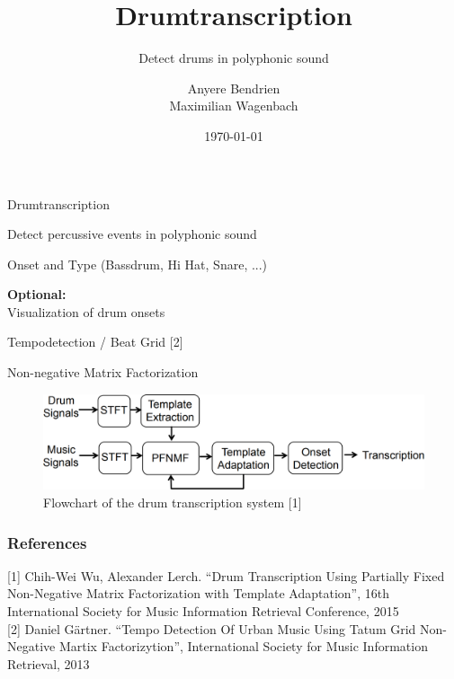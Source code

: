 \documentclass[14pt]{beamer}
\title{Drumtranscription}
\subtitle{Detect drums in polyphonic sound}
\author{Anyere Bendrien \\ Maximilian Wagenbach}
\institute{Audio Content Analysis \\ TU Berlin}
\date{\today}
\begin{document}
\begin{frame}[plain]
\maketitle
\end{frame}

\notosansfont

\begin{frame}{Drumtranscription}
 \begin{fullpageitemize}
  \item Detect percussive events in polyphonic sound
  \item Onset and Type (Bassdrum, Hi Hat, Snare, ...)
  
  \item \textbf{Optional:} \\
        Visualization of drum onsets
  \item Tempodetection / Beat Grid [2]
 \end{fullpageitemize}
\end{frame}

\begin{frame}{Non-negative Matrix Factorization}
 \begin{fullpageitemize}
  \item 
  \begin{figure}
   \includegraphics[width=\textwidth]{images/Flowchart.png}
   \caption{Flowchart of the drum transcription system [1]}
  \end{figure}
  \notosansfont
  \item 
 \end{fullpageitemize}
\end{frame}

\begin{frame}
 \frametitle{References}
  {\small [1] Chih-Wei Wu, Alexander Lerch. “Drum Transcription Using Partially Fixed Non-Negative Matrix Factorization with Template Adaptation”, 16th International Society for Music Information Retrieval Conference, 2015}\\
  {\small [2] Daniel Gärtner. “Tempo Detection Of Urban Music Using Tatum Grid Non-Negative Martix Factorizytion”, International Society for Music Information Retrieval, 2013}
\end{frame}

\end{document}
